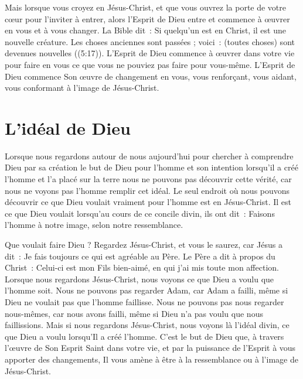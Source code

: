 Mais lorsque vous croyez en Jésus-Christ,
 et que vous ouvrez la porte de votre cœur
 pour l'inviter à entrer,
 alors l'Esprit de Dieu entre et commence à œuvrer en vous
 et à vous changer.
 La Bible dit~:
 \og Si quelqu'un est en Christ, il est une nouvelle créature.
 Les choses anciennes sont passées ; voici~: (toutes choses)
 sont devenues nouvelles \fg{} ((5:17)).
 L'Esprit de Dieu commence à œuvrer dans votre vie pour faire
 en vous ce que vous ne pouviez pas faire pour vous-même.
 L'Esprit de Dieu commence Son œuvre de changement en vous,
 vous renforçant, vous aidant, vous conformant à l'image de Jésus-Christ.


\section{L'id\'eal de Dieu}

\begin{specialpar}{}
Lorsque nous regardons autour de nous aujourd'hui pour
 chercher à comprendre Dieu par sa création
 \ocadr le but de Dieu pour l'homme et son intention
 lorsqu'il a créé l'homme et l'a placé sur la terre \fcadr{}
 nous ne pouvons pas découvrir cette vérité,
 car nous ne voyons pas l'homme remplir cet idéal.
 Le seul endroit où nous pouvons découvrir ce que Dieu voulait vraiment
 pour l'homme est en Jésus-Christ.
 Il est ce que Dieu voulait lorsqu'au cours de ce concile divin, ils ont dit~:
 \og Faisons l'homme à notre image, selon notre ressemblance. \fg{}
\end{specialpar}

Que voulait faire Dieu ?
 Regardez Jésus-Christ, et vous le saurez, car Jésus a dit~:
 \og Je fais toujours ce qui est agréable au Père. \fg{}
 Le Père a dit à propos du Christ~:
 \og Celui-ci est mon Fils bien-aimé, en qui j'ai mis toute mon affection. \fg{}
 Lorsque nous regardons Jésus-Christ,
 nous voyons ce que Dieu a voulu que l'homme soit.
 Nous ne pouvons pas regarder Adam, car Adam a failli,
 même si Dieu ne voulait pas que l'homme faillisse.
 Nous ne pouvons pas nous regarder nous-mêmes,
 car nous avons failli, même si Dieu n'a pas voulu que nous faillissions.
 Mais si nous regardons Jésus-Christ, nous voyons là l'idéal divin,
 ce que Dieu a voulu lorsqu'Il a créé l'homme.
 C'est le but de Dieu que, à travers l'œuvre de Son Esprit Saint dans votre vie,
 et par la puissance de l'Esprit à vous apporter des changements,
 Il vous amène à être à la ressemblance ou à l'image de Jésus-Christ.

